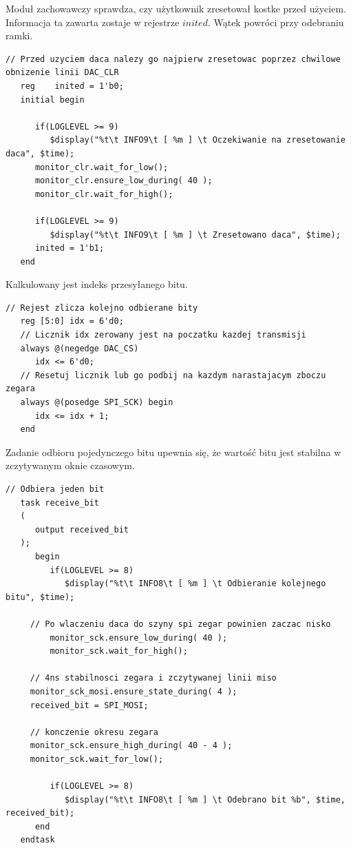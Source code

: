 \documentclass[a4paper,12pt]{article}
\begin{document}
Moduł zachowawczy sprawdza, czy użytkownik zresetował kostke przed użyciem. Informacja ta zawarta zostaje w rejestrze $inited$. Wątek powróci przy odebraniu ramki.
\begin{lstlisting}[label=DacLTC2624Behav,caption=DacLTC2624Behav.v,firstnumber=63]
   // Przed uzyciem daca nalezy go najpierw zresetowac poprzez chwilowe obnizenie linii DAC_CLR
   reg 	  inited = 1'b0;
   initial begin

      if(LOGLEVEL >= 9)
         $display("%t\t INFO9\t [ %m ] \t Oczekiwanie na zresetowanie daca", $time);
      monitor_clr.wait_for_low();
      monitor_clr.ensure_low_during( 40 );
      monitor_clr.wait_for_high();

      if(LOGLEVEL >= 9)
         $display("%t\t INFO9\t [ %m ] \t Zresetowano daca", $time);
      inited = 1'b1;
   end
\end{lstlisting}

Kalkulowany jest indeks przesyłanego bitu.
\begin{lstlisting}[label=DacLTC2624Behav,caption=DacLTC2624Behav.v,firstnumber=78]
   // Rejest zlicza kolejno odbierane bity
   reg [5:0] idx = 6'd0;
   // Licznik idx zerowany jest na poczatku kazdej transmisji
   always @(negedge DAC_CS)
      idx <= 6'd0;
   // Resetuj licznik lub go podbij na kazdym narastajacym zboczu zegara
   always @(posedge SPI_SCK) begin
      idx <= idx + 1;
   end
\end{lstlisting}

Zadanie odbioru pojedynczego bitu upewnia się, że wartość bitu jest stabilna w zczytywanym oknie czasowym.
\begin{lstlisting}[label=DacLTC2624Behav,caption=DacLTC2624Behav.v,firstnumber=88]
   // Odbiera jeden bit
   task receive_bit
   (
      output received_bit
   );
      begin
         if(LOGLEVEL >= 8)
            $display("%t\t INFO8\t [ %m ] \t Odbieranie kolejnego bitu", $time);

	 // Po wlaczeniu daca do szyny spi zegar powinien zaczac nisko
         monitor_sck.ensure_low_during( 40 );
         monitor_sck.wait_for_high();

	 // 4ns stabilnosci zegara i zczytywanej linii miso
	 monitor_sck_mosi.ensure_state_during( 4 );
	 received_bit = SPI_MOSI;

	 // konczenie okresu zegara
	 monitor_sck.ensure_high_during( 40 - 4 );
	 monitor_sck.wait_for_low();

         if(LOGLEVEL >= 8)
            $display("%t\t INFO8\t [ %m ] \t Odebrano bit %b", $time, received_bit);
      end
   endtask
\end{lstlisting}
\end{document}

